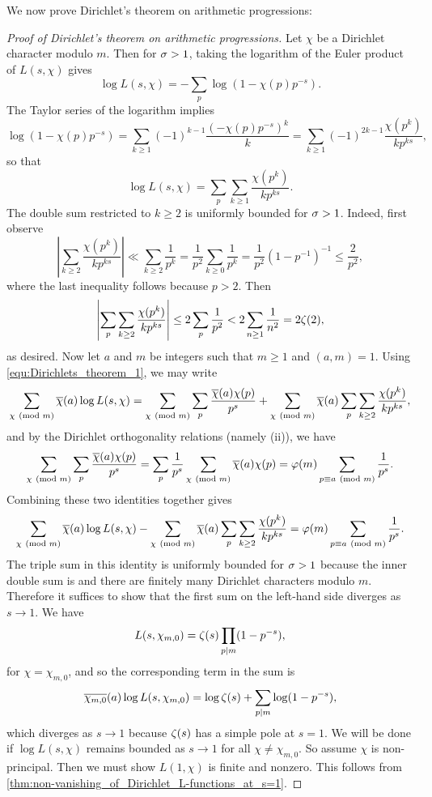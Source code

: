     We now prove Dirichlet's theorem on arithmetic progressions:

    \begin{proof}[Proof of Dirichlet's theorem on arithmetic progressions]
        Let $\chi$ be a Dirichlet character modulo $m$. Then for $\sigma > 1$, taking the logarithm of the Euler product of $L(s,\chi)$ gives
        \[
          \log{L(s,\chi)} = -\sum_{p}\log(1-\chi(p)p^{-s}).
        \]
        The Taylor series of the logarithm implies
        \[
          \log(1-\chi(p)p^{-s}) = \sum_{k \ge 1}(-1)^{k-1}\frac{(-\chi(p)p^{-s})^{k}}{k} = \sum_{k \ge 1}(-1)^{2k-1}\frac{\chi(p^{k})}{kp^{ks}},
        \]
        so that
        \begin{equation}\label{equ:Dirichlets_theorem_1}
          \log{L(s,\chi)} = \sum_{p}\sum_{k \ge 1}\frac{\chi(p^{k})}{kp^{ks}}.
        \end{equation}
        The double sum restricted to $k \ge 2$ is uniformly bounded for $\sigma > 1$. Indeed, first observe
        \[
          \left|\sum_{k \ge 2}\frac{\chi(p^{k})}{kp^{ks}}\right| \ll \sum_{k \ge 2}\frac{1}{p^{k}} = \frac{1}{p^{2}}\sum_{k \ge 0}\frac{1}{p^{k}} = \frac{1}{p^{2}}(1-p^{-1})^{-1} \le \frac{2}{p^{2}},
        \]
        where the last inequality follows because $p > 2$. Then
        \[
          \left|\sum_{p}\sum_{k \ge 2}\frac{\chi(p^{k})}{kp^{ks}}\right| \le 2\sum_{p}\frac{1}{p^{2}} < 2\sum_{n \ge 1}\frac{1}{n^{2}} = 2\zeta(2),
        \]
        as desired. Now let $a$ and $m$ be integers such that $m \ge 1$ and $(a,m) = 1$. Using \cref{equ:Dirichlets_theorem_1}, we may write
        \[
          \sum_{\chi \ (\mathrm{mod}\text{ }m)}\overline{\chi}(a)\log{L(s,\chi)} = \sum_{\chi \ (\mathrm{mod}\text{ }m)}\sum_{p}\frac{\overline{\chi}(a)\chi(p)}{p^{s}}+\sum_{\chi \ (\mathrm{mod}\text{ }m)}\overline{\chi}(a)\sum_{p}\sum_{k \ge 2}\frac{\chi(p^{k})}{kp^{ks}},
        \]
        and by the Dirichlet orthogonality relations (namely (ii)), we have
        \[
          \sum_{\chi \ (\mathrm{mod}\text{ }m)}\sum_{p}\frac{\overline{\chi}(a)\chi(p)}{p^{s}} = \sum_{p}\frac1{p^{s}}\sum_{\chi \ (\mathrm{mod}\text{ }m)}\overline{\chi}(a)\chi(p) = \varphi(m)\sum_{p \equiv{a} \ (\mathrm{mod}\text{ }m)}\frac{1}{p^{s}}.
        \]
        Combining these two identities together gives
        \[
          \sum_{\chi \ (\mathrm{mod}\text{ }m)}\overline{\chi}(a)\log{L(s,\chi)}-\sum_{\chi \ (\mathrm{mod}\text{ }m)}\overline{\chi}(a)\sum_{p}\sum_{k \ge 2}\frac{\chi(p^{k})}{kp^{ks}} = \varphi(m)\sum_{p \equiv{a} \ (\mathrm{mod}\text{ }m)}\frac{1}{p^{s}}.
        \]
        The triple sum in this identity is uniformly bounded for $\sigma > 1$ because the inner double sum is and there are finitely many Dirichlet characters modulo $m$. Therefore it suffices to show that the first sum on the left-hand side diverges as $s \to 1$. We have
        \[
          L(s,\chi_{m,0}) = \zeta(s)\prod_{p \mid m}(1-p^{-s}),
        \]
        for $\chi = \chi_{m,0}$, and so the corresponding term in the sum is
        \[
          \overline{\chi_{m,0}}(a)\log L(s,\chi_{m,0}) = \log\zeta(s)+\sum_{p \mid m}\log(1-p^{-s}),
        \]
        which diverges as $s \to 1$ because $\zeta(s)$ has a simple pole at $s = 1$. We will be done if $\log{L(s,\chi)}$ remains bounded as $s \to 1$ for all $\chi \neq \chi_{m,0}$. So assume $\chi$ is non-principal. Then we must show $L(1,\chi)$ is finite and nonzero. This follows from \cref{thm:non-vanishing_of_Dirichlet_L-functions_at_s=1}.
    \end{proof}

